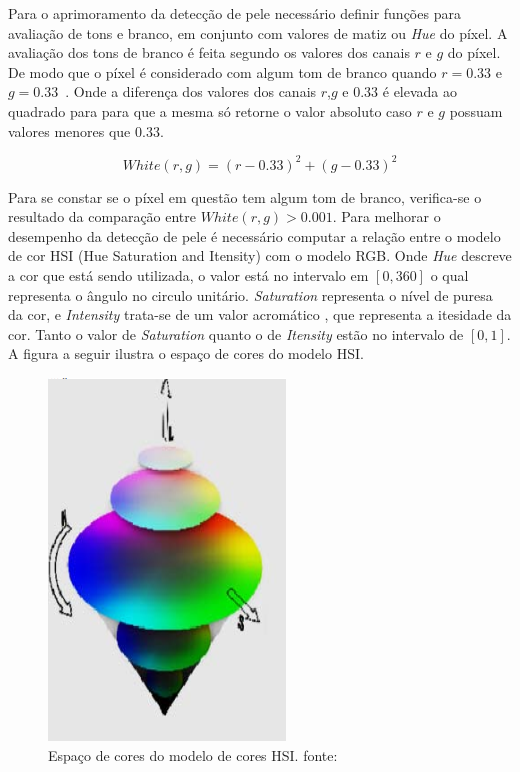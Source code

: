 \documentclass[journal,onecolumn]{IEEEtran}
\begin{document}
	Para o aprimoramento da detecção de pele necessário definir funções para avaliação de tons e branco, em conjunto com valores de matiz ou \textit{Hue} do píxel.
	A avaliação dos tons de branco é feita segundo os valores dos canais $r$ e $g$ do píxel. 
	De modo que o píxel é considerado com algum tom de branco quando $r=0.33$ e $g=0.33$~\cite{chen2007simple}.
	Onde a diferença dos valores dos canais $r$,$g$ e $0.33$ é elevada ao quadrado para para que a mesma só retorne o valor absoluto caso $r$ e $g$ possuam valores menores que $0.33$.
	
	\begin{equation}
		White(r,g) = (r - 0.33)^2 + (g - 0.33)^2 
		\label{eq:whiteValue}
	\end{equation}
	
	Para se constar se o píxel em questão tem algum tom de branco, verifica-se o resultado da comparação entre $White(r,g) > 0.001$.
	Para melhorar o desempenho da detecção de pele é necessário computar a relação entre o modelo de cor HSI (Hue Saturation and Itensity) com o modelo RGB.
	Onde \textit{Hue} descreve a cor que está sendo utilizada, o valor está no intervalo em $[0,360]$ o qual representa o ângulo no circulo unitário.
	\textit{Saturation} representa o nível de puresa da cor, e \textit{Intensity} trata-se de um valor acromático , que representa a itesidade da cor.
	Tanto o valor de \textit{Saturation} quanto o de \textit{Itensity} estão no intervalo de $[0,1]$.
	A figura a seguir ilustra o espaço de cores do modelo HSI. 
	\begin{center}
		\begin{figure}[htb]
			\includegraphics[scale=0.3]{espaco_hsi.png}
			\caption{Espaço de cores do modelo de cores HSI. fonte:\cite{ibraheem2012understanding} }
			\label{fig:espacoCoresHSI}
		\end{figure}
	\end{center}
	
\end{document}
